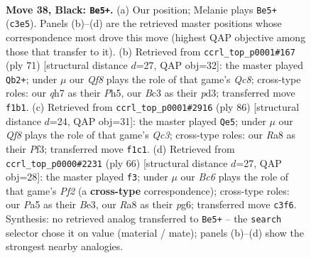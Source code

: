 \documentclass[11pt]{article}
\begin{document}
\clearpage

\begin{figure}[p]\centering
\begin{subfigure}{0.46\textwidth}\centering
\resizebox{\linewidth}{!}{%
\newchessgame
\chessboard[
  setfen={r7/p6Q/2k1p3/p2p4/6P1/2bP2K1/8/5q2 b - - 0 38},
  showmover=false,
  pgfstyle=straightmove, color=movearrow, markmove={c3-e5}
]}
\caption{}
\end{subfigure}\hfill
\begin{subfigure}{0.46\textwidth}\centering
\resizebox{\linewidth}{!}{%
\newchessgame
\chessboard[
  setfen={8/5k2/6p1/Q1p4p/7P/3PP3/5KP1/2q5 b - - 2 36},
  showmover=false,
  pgfstyle=straightmove, color=movearrow, markmove={c1-b2}
]}
\caption{}
\end{subfigure}
\\[4pt]
\begin{subfigure}{0.46\textwidth}\centering
\resizebox{\linewidth}{!}{%
\newchessgame
\chessboard[
  setfen={3q4/5k1p/6p1/p5P1/8/2Q2P2/6P1/7K w - - 1 44},
  showmover=false,
  pgfstyle=straightmove, color=movearrow, markmove={c3-e5}
]}
\caption{}
\end{subfigure}\hfill
\begin{subfigure}{0.46\textwidth}\centering
\resizebox{\linewidth}{!}{%
\newchessgame
\chessboard[
  setfen={8/2bk4/Q3p1p1/3p4/1P6/3PB3/5PK1/3q4 w - - 2 34},
  showmover=false,
  pgfstyle=straightmove, color=movearrow, markmove={f2-f3}
]}
\caption{}
\end{subfigure}
\caption{\textbf{Move 38, Black: \texttt{Be5+}.} (a) Our position; Melanie plays \texttt{Be5+} (\texttt{c3e5}). Panels (b)--(d) are the retrieved master positions whose correspondence most drove this move (highest QAP objective among those that transfer to it). (b) Retrieved from \texttt{ccrl\_top\_p0001\#167} (ply 71) [structural distance $d$=27, QAP obj=32]: the master played \texttt{Qb2+}; under $\mu$ our \emph{Qf8} plays the role of that game's \emph{Qc8}; cross-type roles: our \emph{q}h7 as their \emph{P}h5, our \emph{B}c3 as their \emph{p}d3; transferred move \texttt{f1b1}. (c) Retrieved from \texttt{ccrl\_top\_p0001\#2916} (ply 86) [structural distance $d$=24, QAP obj=31]: the master played \texttt{Qe5}; under $\mu$ our \emph{Qf8} plays the role of that game's \emph{Qc3}; cross-type roles: our \emph{R}a8 as their \emph{P}f3; transferred move \texttt{f1c1}. (d) Retrieved from \texttt{ccrl\_top\_p0000\#2231} (ply 66) [structural distance $d$=27, QAP obj=28]: the master played \texttt{f3}; under $\mu$ our \emph{Bc6} plays the role of that game's \emph{Pf2} (a \textbf{cross-type} correspondence); cross-type roles: our \emph{P}a5 as their \emph{B}e3, our \emph{R}a8 as their \emph{p}g6; transferred move \texttt{c3f6}. Synthesis: no retrieved analog transferred to \texttt{Be5+} -- the \texttt{search} selector chose it on value (material / mate); panels (b)--(d) show the strongest nearby analogies.}
\label{fig:thought-m75}
\end{figure}
\end{document}
